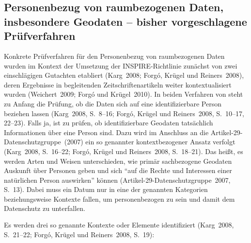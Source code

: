 \documentclass[a4paper,
fontsize=11pt,
oneside,
numbers=noperiodatend,
parskip=half-,
bibliography=totoc,
final
]{scrartcl}
\begin{document}
\hypertarget{personenbezug-von-raumbezogenen-daten-insbesondere-geodaten-bisher-vorgeschlagene-pruxfcfverfahren}{%
\subsection{Personenbezug von raumbezogenen Daten, insbesondere Geodaten
-- bisher vorgeschlagene
Prüfverfahren}\label{personenbezug-von-raumbezogenen-daten-insbesondere-geodaten-bisher-vorgeschlagene-pruxfcfverfahren}}

Konkrete Prüfverfahren für den Personenbezug von raumbezogenen Daten
wurden im Kontext der Umsetzung der INSPIRE-Richtlinie zunächst von zwei
einschlägigen Gutachten etabliert (Karg~2008; Forgó, Krügel und
Reiners~2008), deren Ergebnisse in begleitenden Zeitschriftenartikeln
weiter kontextualisiert wurden (Weichert~2009; Forgó und Krügel~2010).
In beiden Verfahren von steht zu Anfang die Prüfung, ob die Daten sich
auf eine identifizierbare Person beziehen lassen (Karg~2008, S.~8--16;
Forgó, Krügel und Reiners~2008, S.~10--17, 22--23). Falls ja, ist zu
prüfen, ob identifizierbare Geodaten tatsächlich Informationen über eine
Person sind. Dazu wird im Anschluss an die
Artikel-29-Datenschutzgruppe~(2007) ein so genannter kontextbezogener
Ansatz verfolgt (Karg~2008, S.~16--22; Forgó, Krügel und Reiners~2008,
S.~18--21). Das heißt, es werden Arten und Weisen unterschieden, wie
primär sachbezogene Geodaten Auskunft über Personen geben und sich
\enquote{auf die Rechte und Interessen einer natürlichen Person
auswirken} können (Artikel-29-Datenschutzgruppe~2007, S.~13). Dabei muss
ein Datum nur in eine der genannten Kategorien beziehungsweise Kontexte
fallen, um personenbezogen zu sein und damit dem Datenschutz zu
unterfallen.

Es werden drei so genannte Kontexte oder Elemente identifiziert
(Karg~2008, S.~21--22; Forgó, Krügel und Reiners~2008, S.~19):
\end{document}
